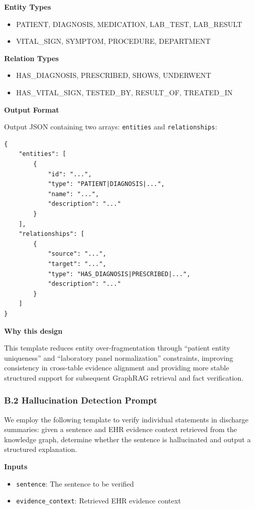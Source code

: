 \documentclass[11pt]{article}
\providecommand{\tightlist}{\setlength{\itemsep}{0pt}\setlength{\parskip}{0pt}}
\begin{document}
\textbf{Entity Types}

\begin{itemize}
\tightlist
\item
  PATIENT, DIAGNOSIS, MEDICATION, LAB\_TEST, LAB\_RESULT
\item
  VITAL\_SIGN, SYMPTOM, PROCEDURE, DEPARTMENT
\end{itemize}

\textbf{Relation Types}

\begin{itemize}
\tightlist
\item
  HAS\_DIAGNOSIS, PRESCRIBED, SHOWS, UNDERWENT
\item
  HAS\_VITAL\_SIGN, TESTED\_BY, RESULT\_OF, TREATED\_IN
\end{itemize}

\textbf{Output Format}

Output JSON containing two arrays: \texttt{entities} and \texttt{relationships}:

\begin{verbatim}
{
    "entities": [
        {
            "id": "...",
            "type": "PATIENT|DIAGNOSIS|...",
            "name": "...",
            "description": "..."
        }
    ],
    "relationships": [
        {
            "source": "...",
            "target": "...",
            "type": "HAS_DIAGNOSIS|PRESCRIBED|...",
            "description": "..."
        }
    ]
}
\end{verbatim}

\textbf{Why this design}

This template reduces entity over-fragmentation through ``patient entity uniqueness'' and ``laboratory panel normalization'' constraints, improving consistency in cross-table evidence alignment and providing more stable structured support for subsequent GraphRAG retrieval and fact verification.

\subsubsection{B.2 Hallucination Detection Prompt}

We employ the following template to verify individual statements in discharge summaries: given a sentence and EHR evidence context retrieved from the knowledge graph, determine whether the sentence is hallucinated and output a structured explanation.

\textbf{Inputs}

\begin{itemize}
\tightlist
\item
  \texttt{sentence}: The sentence to be verified
\item
  \texttt{evidence\_context}: Retrieved EHR evidence context
\end{itemize}
\end{document}
